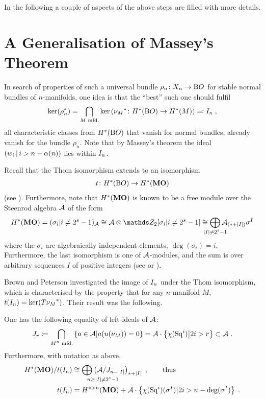 In the following a couple of aspects of the above steps are filled
with more details.


\section*{A Generalisation of Massey's Theorem}
In search of properties of such a universal bundle
$\rho_n\colon X_n\to\mathrm{B}O$ for stable normal bundles of $n$-manifolds,
one idea is that the \enquote{best} such one should fulfil
\begin{gather*}
  \ker({\rho}^*_n)
  = \bigcap_{\text{$M$ mfd.}}
  \ker\left({\nu_{M}}^*\colon H^*(\mathrm{B}O)\to H^*(M)\right)
  \eqqcolon I_{n}
  \;,
\end{gather*}
\idest all characteristic classes from $H^*(\mathrm{B}O)$ that vanish for
normal bundles, already vanish for the bundle $\rho_n$.
Note that by Massey's theorem the ideal
$\left(w_{i}\,\middle|\,i>n-\alpha(n)\right)$ lies within $I_{n}$.

\begin{Rem*}
Recall that the Thom isomorphism extends to an isomorphism
\begin{gather*}
  t\colon H^*(\mathrm{B}O) \to H^*(\bm{\mathrm{MO}})
\end{gather*}
(see \forexample \cite{milnor}).
Furthermore, note that $H^*(\bm{\mathrm{MO}})$ is known to be a free module
over the Steenrod algebra $\mathcal{A}$ of the form
\begin{gather*}
  \H^*(\MOspec)
  = (\sigma_i| i\neq 2^s-1)_{\A}
  \cong \A\otimes \Zmod2[\sigma_i|i\neq 2^s-1]
  \cong \bigoplus_{\mathclap{\Deg{I}\neq 2^s-1}}
  \A_{(*+\Deg{I})}\sigma^I
\end{gather*}
where the $\sigma_i$ are algebraically independent elements,
$\deg(\sigma_i)=i$.
Furthermore, the last isomorphism is one of $\mathcal{A}$-modules, and the sum
is over arbitrary sequences $I$ of positive integers
(see \forexample \cite[p.~82]{immersionconj} or
\cite[Chap.~20]{switzer}).
\end{Rem*}

Brown and Peterson investigated the image of $I_{n}$ under the Thom
isomorphism, which is characterised by the property that for any
$n$-manifold $M$, $t(I_{n})=\ker({T{\nu_{M}}}^*)$.
Their result was the following.
\begin{Thm*}
  One has the following equality of left-ideals of $\mathcal{A}$:
  \begin{gather*}
    J_{r}
    \coloneqq \bigcap_{\text{$M^n$ mfd.}}
    \left\{ a\in\mathcal{A} \middle| a({u}(\nu_{M})) = 0 \right\}
    = \mathcal{A} \cdot \left\{\chi(\mathrm{Sq}^{i}) \middle| 2i>r\right\}
    \subset \mathcal{A}
    \;.
  \end{gather*}
  Furthermore, with notation as above,
  \begin{align*}
    \H^*(\MOspec)/\thomiso(\I n)
    &\cong \bigoplus_{\mathrlap{n\geq\Deg{I}\neq 2^s-1}}
      \left( \A / \J{n-\Deg{I}} \right)_{*+\Deg{I}}
      \;,\qquad\text{thus}\\
    \thomiso(\I n)
    &= \H^{*>n}(\MOspec)
    + \A\cdot \left\{
      \antipode(\Sq i)(\sigma^I) \middle| 2i>n-\deg(\sigma^I)
    \right\}
      \;.
  \end{align*}
\end{Thm*}

